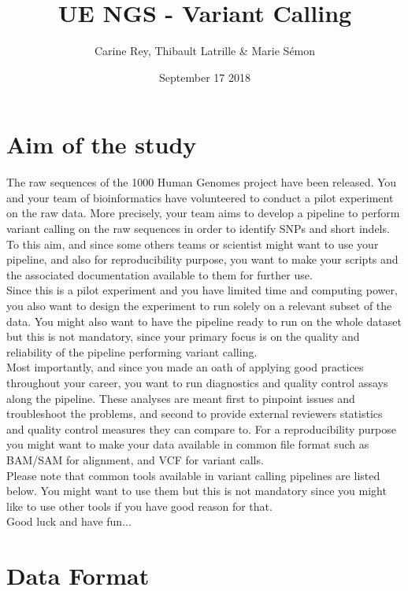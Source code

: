 \documentclass[8pt]{article}
\title{
UE NGS - Variant Calling\\
}
\author{Carine Rey, Thibault Latrille \& Marie Sémon }
\date{September 17 2018}
\begin{document}
\maketitle
\tableofcontents

\section{Aim of the study}

The raw sequences of the 1000 Human Genomes project have been released. You and your team of bioinformatics have volunteered to conduct a pilot experiment on the raw data. More precisely, your team aims to develop a pipeline to perform variant calling on the raw sequences in order to identify SNPs and short indels. To this aim, and since some others teams or scientist might want to use your pipeline, and also for reproducibility purpose, you want to make your scripts and the associated documentation available to them for further use. \\

Since this is a pilot experiment and you have limited time and computing power, you also want to design the experiment to run solely on a relevant subset of the data. You might also want to have the pipeline ready to run on the whole dataset but this is not mandatory, since your primary focus is on the quality and reliability of the pipeline performing variant calling.\\

Most importantly, and since you made an oath of applying good practices throughout your career, you want to run diagnostics and quality control assays along the pipeline. These analyses are meant first to pinpoint issues and troubleshoot the problems, and second to provide external reviewers statistics and quality control measures they can compare to. For a reproducibility purpose you might want to make your data available in common file format such as BAM/SAM for alignment, and VCF for variant calls. \\

Please note that common tools available in variant calling pipelines are listed below. You might want to use them but this is not mandatory since you might like to use other tools if you have good reason for that.\\

Good luck and have fun...

\section{Data Format}
\end{document}
